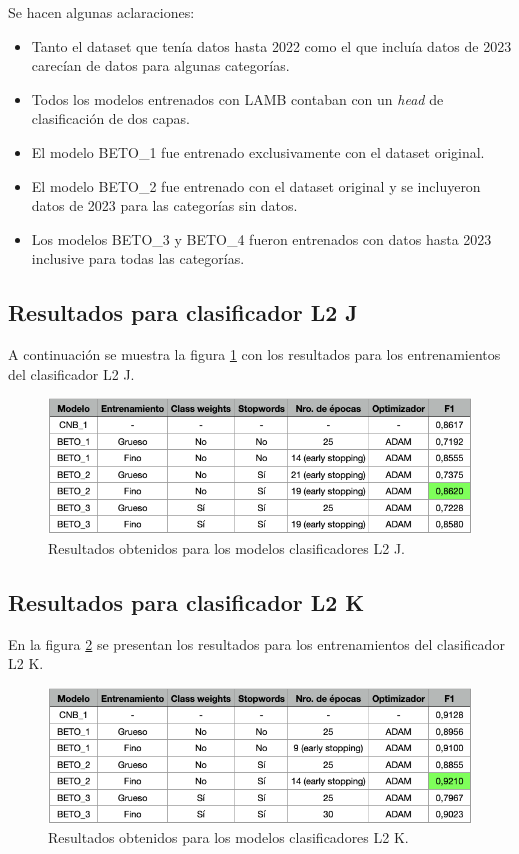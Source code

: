 Se hacen algunas aclaraciones:
\begin{itemize}
	\item Tanto el dataset que tenía datos hasta 2022 como el que incluía datos de 2023 carecían de datos para algunas categorías.
	\item Todos los modelos entrenados con LAMB contaban con un \textit{head} de clasificación de dos capas.
	\item El modelo BETO\_1 fue entrenado exclusivamente con el dataset original.
	\item El modelo BETO\_2 fue entrenado con el dataset original y se incluyeron datos de 2023 para las categorías sin datos.
	\item Los modelos BETO\_3 y BETO\_4 fueron entrenados con datos hasta 2023 inclusive para todas las categorías.
\end{itemize}

\subsection{Resultados para clasificador L2 J}

A continuación se muestra la figura \ref{fig:res-l2j} con los resultados para los entrenamientos del clasificador L2 J.

\begin{figure}[htbp]
	\centering
	\includegraphics[width=1\textwidth]{./Figures/cap4-resultados-l2j.png}
	\caption{Resultados obtenidos para los modelos clasificadores L2 J.}
	\label{fig:res-l2j}
\end{figure}

\subsection{Resultados para clasificador L2 K}

En la figura \ref{fig:res-l2k} se presentan los resultados para los entrenamientos del clasificador L2 K.

\begin{figure}[htbp]
	\centering
	\includegraphics[width=1\textwidth]{./Figures/cap4-resultados-l2k.png}
	\caption{Resultados obtenidos para los modelos clasificadores L2 K.}
	\label{fig:res-l2k}
\end{figure}

